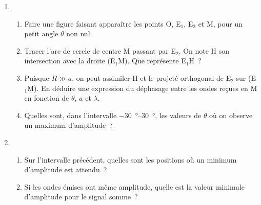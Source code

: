 \documentclass[a4paper, 12pt, final, garamond]{book}
\begin{document}
\begin{enumerate}
    \item
        \begin{enumerate}
            \item Faire une figure faisant apparaître les points O, E$_1$, E$_2$
                et M, pour un petit angle $\theta$ non nul.
            \item Tracer l'arc de cercle de centre M passant par E$_2$. On note
                H son intersection avec la droite (E$_1$M). Que représente
                E$_1$H~?
            \item Puisque $R \gg a$, on peut assimiler H et le projeté
                orthogonal de E$_2$ sur (E$_1$M). En déduire une expression du
                déphasage entre les ondes reçues en M en fonction de $\theta$,
                $a$ et $\lambda$.
            \item Quelles sont, dans l'intervalle \SIrange{-30}{30}{\degree},
                les valeurs de $\theta$ où on observe un maximum d'amplitude~?
        \end{enumerate}
    \item
        \begin{enumerate}
            \item Sur l'intervalle précédent, quelles sont les positions où un
                minimum d'amplitude est attendu~?
            \item Si les ondes émises ont même amplitude, quelle est la valeur
                minimale d'amplitude pour le signal somme~?
        \end{enumerate}
\end{enumerate}
\end{document}
